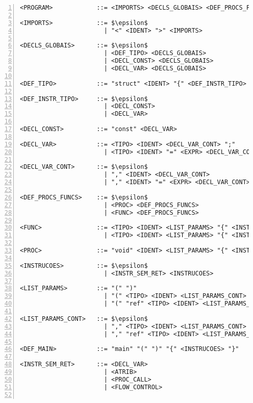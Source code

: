 
\begin{lstlisting}[frame=single,numbers=left,breaklines=true,mathescape=true>,basicstyle=\ttfamily\scriptsize]
<PROGRAM>            ::= <IMPORTS> <DECLS_GLOBAIS> <DEF_PROCS_FUNCS> <DEF_MAIN>

<IMPORTS>            ::= $\epsilon$
                       | "<" <IDENT> ">" <IMPORTS>

<DECLS_GLOBAIS>      ::= $\epsilon$
                       | <DEF_TIPO> <DECLS_GLOBAIS>
                       | <DECL_CONST> <DECLS_GLOBAIS>
                       | <DECL_VAR> <DECLS_GLOBAIS>  

<DEF_TIPO>           ::= "struct" <IDENT> "{" <DEF_INSTR_TIPO> "}"

<DEF_INSTR_TIPO>     ::= $\epsilon$
                       | <DECL_CONST>
                       | <DECL_VAR>

<DECL_CONST>         ::= "const" <DECL_VAR>

<DECL_VAR>           ::= <TIPO> <IDENT> <DECL_VAR_CONT> ";"
                       | <TIPO> <IDENT> "=" <EXPR> <DECL_VAR_CONT> ";"

<DECL_VAR_CONT>      ::= $\epsilon$
                       | "," <IDENT> <DECL_VAR_CONT>
                       | "," <IDENT> "=" <EXPR> <DECL_VAR_CONT>

<DEF_PROCS_FUNCS>    ::= $\epsilon$
                       | <PROC> <DEF_PROCS_FUNCS>
                       | <FUNC> <DEF_PROCS_FUNCS>

<FUNC>               ::= <TIPO> <IDENT> <LIST_PARAMS> "{" <INSTRUCOES> "return" <EXPR> "}"
                       | <TIPO> <IDENT> <LIST_PARAMS> "{" <INSTRUCOES> "return" <EXPR> ";" "}"

<PROC>               ::= "void" <IDENT> <LIST_PARAMS> "{" <INSTRUCOES> "}"

<INSTRUCOES>         ::= $\epsilon$
                       | <INSTR_SEM_RET> <INSTRUCOES>

<LIST_PARAMS>        ::= "(" ")"
                       | "(" <TIPO> <IDENT> <LIST_PARAMS_CONT> ")"
                       | "(" "ref" <TIPO> <IDENT> <LIST_PARAMS_CONT> ")"

<LIST_PARAMS_CONT>   ::= $\epsilon$
                       | "," <TIPO> <IDENT> <LIST_PARAMS_CONT>
                       | "," "ref" <TIPO> <IDENT> <LIST_PARAMS_CONT>

<DEF_MAIN>           ::= "main" "(" ")" "{" <INSTRUCOES> "}"

<INSTR_SEM_RET>      ::= <DECL_VAR>
                       | <ATRIB>
                       | <PROC_CALL>
                       | <FLOW_CONTROL>


\end{lstlisting}
